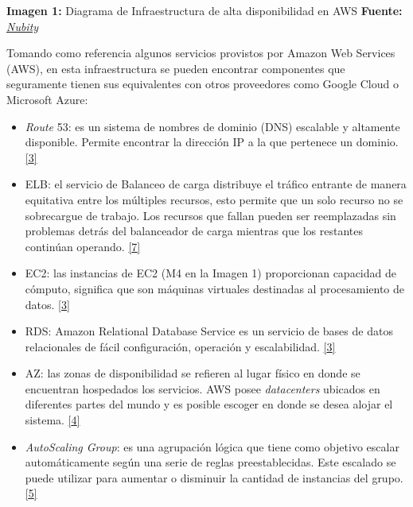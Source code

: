 \documentclass[12pt,spanish,Letterpaper,openany]{book}
\newcommand{\spacetwomilis}{\vspace{2mm}}
\begin{document}


\textbf{Imagen 1:} Diagrama de Infraestructura de alta disponibilidad en AWS \textbf{Fuente:} \href{https://sites.nubity.com/}{\emph{Nubity}}


Tomando como referencia algunos servicios provistos por Amazon Web Services (AWS), en esta infraestructura se pueden encontrar componentes que seguramente tienen sus equivalentes con otros proveedores como Google Cloud o Microsoft Azure:

\hypertarget{articulo08_cross03}{}
\hypertarget{articulo08_cross04}{}
\hypertarget{articulo08_cross05}{}
\hypertarget{articulo08_cross06}{}
\spacetwomilis

\begin{itemize}
\item
  \emph{Route} 53: es un sistema de nombres de dominio (DNS) escalable y altamente disponible. Permite encontrar la dirección IP a la que pertenece un dominio. \protect\hyperlink{articulo08_ref03}{{[}3{]}}
\item
  ELB: el servicio de Balanceo de carga distribuye el tráfico entrante de manera equitativa entre los múltiples recursos, esto permite que un solo recurso no se sobrecargue de trabajo. Los recursos que fallan pueden ser reemplazadas sin problemas detrás del balanceador de carga mientras que los restantes continúan operando. \protect\hyperlink{articulo08_ref07}{{[}7{]}}
\item
  EC2: las instancias de EC2 (M4 en la Imagen 1) proporcionan capacidad de cómputo, significa que son máquinas virtuales destinadas al procesamiento de datos. \protect\hyperlink{articulo08_ref03}{{[}3{]}}
\item
  RDS: Amazon Relational Database Service es un servicio de bases de datos relacionales de fácil configuración, operación y escalabilidad. \protect\hyperlink{articulo08_ref03}{{[}3{]}}
\item
  AZ: las zonas de disponibilidad se refieren al lugar físico en donde se encuentran hospedados los servicios. AWS posee \emph{datacenters} ubicados en diferentes partes del mundo y es posible escoger en donde se desea alojar el sistema. \protect\hyperlink{articulo08_ref04}{{[}4{]}}
\item
  \emph{AutoScaling Group}: es una agrupación lógica que tiene como objetivo escalar automáticamente según una serie de reglas preestablecidas. Este escalado se puede utilizar para aumentar o disminuir la cantidad de instancias del grupo. \protect\hyperlink{articulo08_ref05}{{[}5{]}}
\end{itemize}
\end{document}
